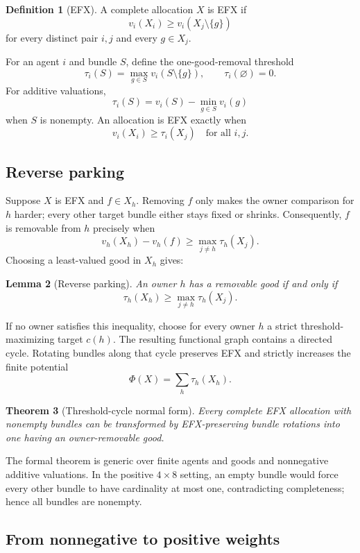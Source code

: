 \documentclass[11pt]{article}
\newtheorem{theorem}{Theorem}[section]
\newtheorem{lemma}[theorem]{Lemma}
\theoremstyle{definition}
\newtheorem{definition}[theorem]{Definition}
\begin{document}
\begin{definition}[EFX]
A complete allocation $X$ is EFX if
\[
  v_i(X_i)\ge v_i(X_j\setminus\{g\})
\]
for every distinct pair $i,j$ and every $g\in X_j$.
\end{definition}

For an agent $i$ and bundle $S$, define the one-good-removal threshold
\[
  \tau_i(S)=\max_{g\in S}v_i(S\setminus\{g\}),\qquad
  \tau_i(\varnothing)=0.
\]
For additive valuations,
\[
  \tau_i(S)=v_i(S)-\min_{g\in S}v_i(g)
\]
when $S$ is nonempty. An allocation is EFX exactly when
\[
  v_i(X_i)\ge\tau_i(X_j)\quad\text{for all }i,j.
\]

\subsection{Reverse parking}

Suppose $X$ is EFX and $f\in X_h$. Removing $f$ only makes the owner
comparison for $h$ harder; every other target bundle either stays fixed or
shrinks. Consequently, $f$ is removable from $h$ precisely when
\[
  v_h(X_h)-v_h(f)\ge\max_{j\ne h}\tau_h(X_j).
\]
Choosing a least-valued good in $X_h$ gives:

\begin{lemma}[Reverse parking]\label{lem:parking}
An owner $h$ has a removable good if and only if
\[
  \tau_h(X_h)\ge\max_{j\ne h}\tau_h(X_j).
\]
\end{lemma}

If no owner satisfies this inequality, choose for every owner $h$ a strict
threshold-maximizing target $c(h)$. The resulting functional graph contains
a directed cycle. Rotating bundles along that cycle preserves EFX and
strictly increases the finite potential
\[
  \Phi(X)=\sum_h\tau_h(X_h).
\]

\begin{theorem}[Threshold-cycle normal form]\label{thm:cycle}
Every complete EFX allocation with nonempty bundles can be transformed by
EFX-preserving bundle rotations into one having an owner-removable good.
\end{theorem}

The formal theorem is generic over finite agents and goods and nonnegative
additive valuations. In the positive $4\times8$ setting, an empty bundle
would force every other bundle to have cardinality at most one, contradicting
completeness; hence all bundles are nonempty.

\subsection{From nonnegative to positive weights}
\end{document}
